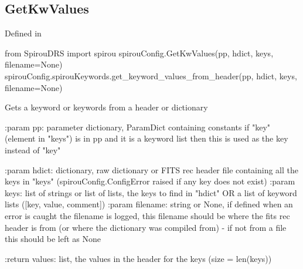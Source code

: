 \begin{minipage}{\textwidth}
\subsection{GetKwValues}

Defined in \spirouConfig{}

\begin{pythonbox}
from SpirouDRS import spirou
spirouConfig.GetKwValues(pp, hdict, keys, filename=None)
spirouConfig.spirouKeywords.get_keyword_values_from_header(pp, hdict, keys, filename=None)
\end{pythonbox}

\begin{pythondocstring}
Gets a keyword or keywords from a header or dictionary

:param pp: parameter dictionary, ParamDict containing constants
            if "key" (element in "keys") is in pp and it is a
            keyword list then this is used as the key instead of "key"

:param hdict: dictionary, raw dictionary or FITS rec header file containing
              all the keys in "keys" (spirouConfig.ConfigError raised if
              any key does not exist)
:param keys: list of strings or list of lists, the keys to find in "hdict"
             OR a list of keyword lists ([key, value, comment])
:param filename: string or None, if defined when an error is caught the
                 filename is logged, this filename should be where the
                 fits rec header is from (or where the dictionary was
                 compiled from) - if not from a file this should be left
                 as None

:return values: list, the values in the header for the keys
                (size = len(keys))
\end{pythondocstring}
\end{minipage}

